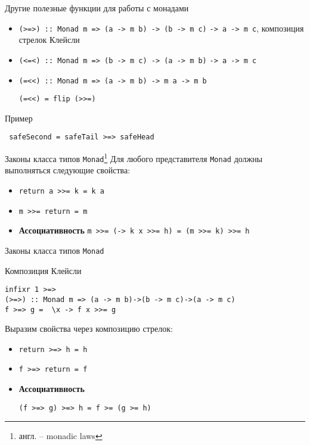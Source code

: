 \documentclass{beamer}
\newcommand{\hs}[1]{\texttt{#1}}
\begin{document}
  \begin{frame}[fragile]{Другие полезные функции для работы с монадами}
      \begin{itemize}
          \item \hs{(>=>) :: Monad m => (a -> m b) -> (b -> m c)} \hs{-> a -> m c},
           композиция стрелок Клейсли
           \item \hs{(<=<) :: Monad m => (b -> m c) -> (a -> m b)} \hs{-> a -> m c}
           \item \hs{(=<<) :: Monad m => (a -> m b) -> m a -> m b}
            
           \hs{(=<<) = flip (>>=)}
      \end{itemize}
      \begin{block}{Пример}
     \begin{verbatim}
 safeSecond = safeTail >=> safeHead
     \end{verbatim}
     \end{block}
  \end{frame}
  \begin{frame}{Законы класса типов \texttt{Monad}\footnote{англ. -- monadic laws}}
      Для любого представителя \texttt{Monad} должны выполняться следующие свойства:
      \begin{itemize}
          \item \hs{return a >>= k = k a}
          \item \hs{m >>= return = m}
          \item \textbf{Ассоциативность} \hs{m >>= (\x -> k x >>= h) = (m >>= k) >>= h}
      \end{itemize}
  \end{frame}
  \begin{frame}[fragile]{Законы класса типов \texttt{Monad}}
      \begin{block}{Композиция Клейсли}
      \begin{verbatim}
infixr 1 >=>
(>=>) :: Monad m => (a -> m b)->(b -> m c)->(a -> m c)
f >=> g =  \x -> f x >>= g
      \end{verbatim}
      \end{block}
      Выразим свойства через композицию стрелок:
      \begin{itemize}
          \item \hs{return >=> h = h}
          \item \hs{f >=> return = f}
          \item \textbf{Ассоциативность}
          
          \hs{(f >=> g) >=> h = f >= (g >= h)}
      \end{itemize}
  \end{frame}
\end{document}
